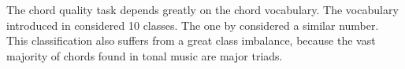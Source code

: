 
The chord quality task depends greatly on the chord
vocabulary. The vocabulary introduced in
\textcite{chen2018functional} considered 10 classes. The one
by \textcite{micchi2020not} considered a similar number.
This classification also suffers from a great class
imbalance, because the vast majority of chords found in
tonal music are major triads.

